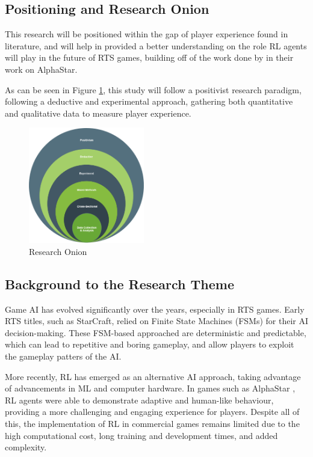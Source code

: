\documentclass[conference]{IEEEtran}
\begin{document}
\subsection{Positioning and Research Onion}

This research will be positioned within the gap of player experience found in literature, and will help in provided a better understanding on the role RL agents will play in the future of RTS games, building off of the
work done by \cite{vinyals_grandmaster_2019} in their work on AlphaStar.

As can be seen in Figure \ref{fig:research_onion}, this study will follow a positivist research paradigm, following a deductive and experimental approach, gathering both quantitative and qualitative data to measure player experience.

\begin{figure}[htbp]
    \centering
    \includegraphics[width=0.45\textwidth]{../Images/Research_Onion.PNG}
    \caption{Research Onion}
    \label{fig:research_onion}
\end{figure}

\subsection{Background to the Research Theme}
Game AI has evolved significantly over the years, especially in RTS games. Early RTS titles, such as StarCraft, relied on Finite State Machines (FSMs) for their AI decision-making. These FSM-based approached
are deterministic and predictable, which can lead to repetitive and boring gameplay, and allow players to exploit the gameplay patters of the AI.

More recently, RL has emerged as an alternative AI approach, taking advantage of advancements in ML and computer hardware. In games such as AlphaStar \cite{vinyals_grandmaster_2019}, RL agents were able to 
demonstrate adaptive and human-like behaviour, providing a more challenging and engaging experience for players. Despite all of this, the implementation of RL in commercial games remains limited due to
the high computational cost, long training and development times, and added complexity. 
\end{document}
